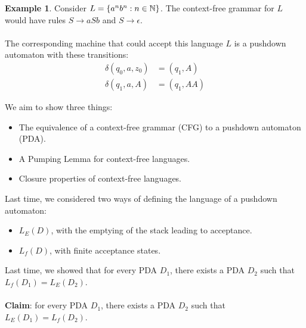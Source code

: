 \documentclass[]{article}
\DeclarePairedDelimiter{\set}{\lbrace}{\rbrace}
\theoremstyle{definition}
\newtheorem{ex}{Example}[section]
\newcommand{\lecture}[1]{\marginpar{{\footnotesize $\leftarrow$ \underline{#1}}}}
\begin{document}
        \begin{ex} \lecture{October 24, 2013}
          Consider $L = \set{a^n b^n : n \in \mathbb{N}}$. The context-free grammar for $L$ would have rules $S \to aSb$ and $S \to \epsilon$.
          \\ \\
          The corresponding machine that could accept this language $L$ is a pushdown automaton with these transitions:
          \begin{align*}
            \delta(q_0, a, z_0) &= (q_1, A) \\
            \delta(q_1, a, A) &= (q_1, AA)
          \end{align*}
        \end{ex}

        We aim to show three things:
        \begin{itemize}
          \item The equivalence of a context-free grammar (CFG) to a pushdown automaton (PDA).
          \item A Pumping Lemma for context-free languages.
          \item Closure properties of context-free languages.
        \end{itemize}

        Last time, we considered two ways of defining the language of a pushdown automaton:
        \begin{itemize}
          \item $L_E(D)$, with the emptying of the stack leading to acceptance.
          \item $L_f(D)$, with finite acceptance states.
        \end{itemize}

        Last time, we showed that for every PDA $D_1$, there exists a PDA $D_2$ such that $L_f(D_1) = L_E(D_2)$.
        \\ \\
        \textbf{Claim}: for every PDA $D_1$, there exists a PDA $D_2$ such that $L_E(D_1) = L_f(D_2)$.
\end{document}

